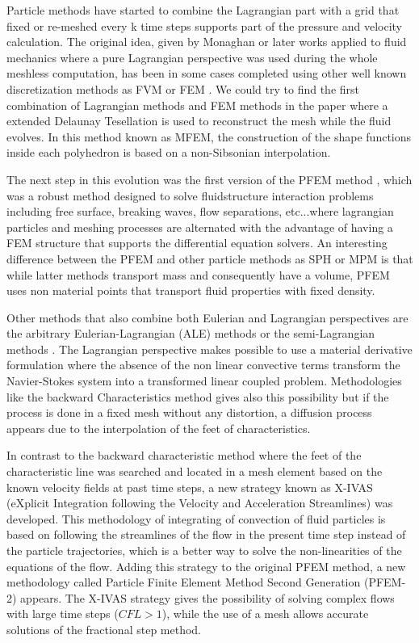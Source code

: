 
Particle methods have started to combine the Lagrangian part with a grid that fixed or re-meshed every k time steps supports part of the pressure and velocity calculation. The original idea, given by Monaghan \cite{Mon77} or later works applied to fluid mechanics \cite{Monaghan88} where a pure Lagrangian perspective was used during the whole meshless computation, has been in some cases completed using other well known discretization methods as FVM \cite{Nestor20091733} or FEM \cite{Ide03}. We could try to find the first combination of Lagrangian methods and FEM methods in the paper \cite{Ide03b} where a extended Delaunay Tesellation is used to reconstruct the mesh while the fluid evolves. In this method known as MFEM, the construction of the shape functions inside each polyhedron is based on a non-Sibsonian interpolation.

The next step in this evolution was the first version of the PFEM method \cite{Idelsohn04}, which was a robust method designed to solve fluidstructure interaction problems including free surface, breaking waves, flow separations, etc...where lagrangian particles and meshing processes are alternated with the advantage of having a FEM structure that supports the differential equation solvers. An interesting difference between the PFEM and other particle methods as SPH or MPM \cite{Wieckowsky04} is that while latter methods transport mass and consequently have a volume, PFEM uses non material points that transport fluid properties with fixed density.

Other methods that also combine both Eulerian and Lagrangian perspectives are the arbitrary Eulerian-Lagrangian (ALE)\cite{Donea83} methods or the semi-Lagrangian methods \cite{Bermejo}. The Lagrangian perspective makes possible to use a material derivative formulation where the absence of the non linear convective terms transform the Navier-Stokes system into a transformed linear coupled problem. Methodologies like the backward Characteristics method \cite{Bermejo} gives also this possibility but if the process is done in a fixed mesh without any distortion, a diffusion process appears due to the interpolation of the feet of characteristics.

In contrast to the backward characteristic method where the feet of the characteristic line was searched and located in a mesh element based on the known velocity fields at past time steps, a new strategy known as X-IVAS (eXplicit Integration following the Velocity and Acceleration Streamlines) was developed\cite{Idelsohn12}. This methodology of integrating of convection of fluid particles is based on following the streamlines of the flow in the present time step instead of the particle trajectories, which is a better way to solve the non-linearities of the equations of the flow. Adding this strategy to the original PFEM method, a new methodology called Particle Finite Element Method Second Generation (PFEM-2)\cite{Idelsohn12b} appears. The X-IVAS strategy gives the possibility of solving complex flows with large time steps ($CFL>1$), while the use of a mesh allows accurate solutions of the fractional step method. 

